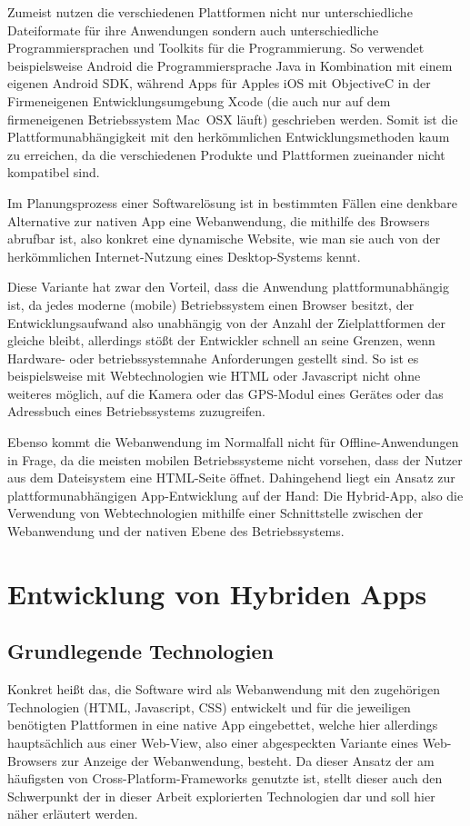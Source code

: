 \todo[inline]{[ALT]:}
Zumeist nutzen die verschiedenen Plattformen nicht nur unterschiedliche Dateiformate für ihre Anwendungen sondern auch unterschiedliche Programmiersprachen und Toolkits für die Programmierung. So verwendet beispielsweise Android die Programmiersprache Java in Kombination mit einem eigenen Android SDK, während Apps für Apples iOS mit ObjectiveC in der Firmeneigenen Entwicklungsumgebung Xcode (die auch nur auf dem firmeneigenen Betriebssystem Mac~OSX läuft) geschrieben werden. Somit ist die Plattformunabhängigkeit mit den herkömmlichen Entwicklungsmethoden kaum zu erreichen, da die verschiedenen Produkte und Plattformen zueinander nicht kompatibel sind.

Im Planungsprozess einer Softwarelösung ist in bestimmten Fällen eine denkbare Alternative zur nativen App eine Webanwendung, die mithilfe des Browsers abrufbar ist, also konkret eine dynamische Website, wie man sie auch von der herkömmlichen Internet-Nutzung eines Desktop-Systems kennt. 

Diese Variante hat zwar den Vorteil, dass die Anwendung plattformunabhängig ist, da jedes moderne (mobile) Betriebssystem einen Browser besitzt, der Entwicklungsaufwand also unabhängig von der Anzahl der Zielplattformen der gleiche bleibt, allerdings stößt der Entwickler schnell an seine Grenzen, wenn Hardware- oder betriebssystemnahe Anforderungen gestellt sind. So ist es beispielsweise mit Webtechnologien wie HTML oder Javascript nicht ohne weiteres möglich, auf die Kamera oder das GPS-Modul eines Gerätes oder das Adressbuch eines Betriebssystems zuzugreifen.

Ebenso kommt die Webanwendung im Normalfall nicht für Offline-Anwendungen in Frage, da die meisten mobilen Betriebssysteme nicht vorsehen, dass der Nutzer aus dem Dateisystem eine HTML-Seite öffnet.  
Dahingehend liegt ein Ansatz zur plattformunabhängigen App-Entwicklung auf der Hand: Die Hybrid-App, also die Verwendung von Webtechnologien mithilfe einer Schnittstelle zwischen der Webanwendung und der nativen Ebene des Betriebssystems.

\section{Entwicklung von Hybriden Apps}
\subsection{Grundlegende Technologien}
Konkret heißt das, die Software wird als Webanwendung mit den zugehörigen Technologien (HTML, Javascript, CSS) entwickelt und für die jeweiligen benötigten Plattformen in eine native App eingebettet, welche hier allerdings hauptsächlich aus einer Web-View, also einer abgespeckten Variante eines Web-Browsers zur Anzeige der Webanwendung, besteht. Da dieser Ansatz der am häufigsten von Cross-Platform-Frameworks genutzte ist,  stellt dieser auch den Schwerpunkt der in dieser Arbeit explorierten Technologien dar und soll hier näher erläutert werden. 

